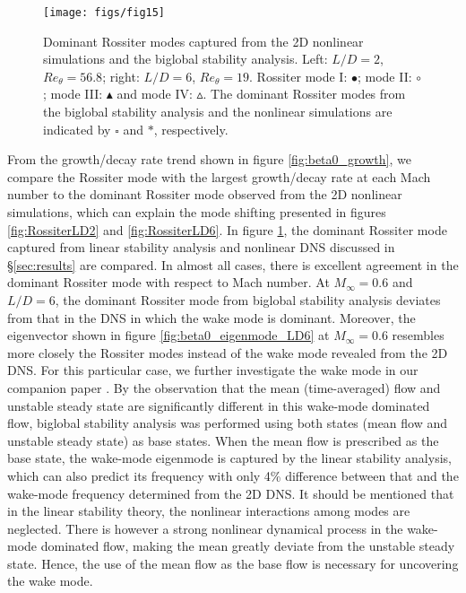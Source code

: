 \documentclass{jfm}
\begin{document}
\begin{figure}
\begin{center}
  \texttt{[image: figs/fig15]}
   \caption{Dominant Rossiter modes captured from the 2D nonlinear simulations and the biglobal stability analysis. Left: $L/D=2$, $Re_\theta=56.8$; right: $L/D=6$, $Re_\theta=19$. Rossiter mode I: $\bullet$; mode II: $\circ$; mode III: $\blacktriangle$ and mode IV: $\vartriangle$. The dominant Rossiter modes from the biglobal stability analysis and the nonlinear simulations are indicated by $\square$ and $*$, respectively. } 
      \label{fig:beta0_stl} 
\end{center}
\end{figure}
From the growth/decay rate trend shown in figure \ref{fig:beta0_growth}, we compare the Rossiter mode with the largest growth/decay rate at each Mach number to the dominant Rossiter mode observed from the 2D nonlinear simulations, which can explain the mode shifting presented in figures \ref{fig:RossiterLD2} and \ref{fig:RossiterLD6}. In figure \ref{fig:beta0_stl}, the dominant Rossiter mode captured from linear stability analysis and nonlinear DNS discussed in \S \ref{sec:results} are compared. In almost all cases, there is excellent agreement in the dominant Rossiter mode with respect to Mach number. At $M_\infty=0.6$ and $L/D=6$, the dominant Rossiter mode from biglobal stability analysis deviates from that in the DNS in which the wake mode is dominant. Moreover, the eigenvector shown in figure \ref{fig:beta0_eigenmode_LD6} at $M_\infty=0.6$ resembles more closely the Rossiter modes instead of the wake mode revealed from the 2D DNS. For this particular case, we further investigate the wake mode in our companion paper \citep{Sun:TCFD16}. By the observation that the mean (time-averaged) flow and unstable steady state are significantly different in this wake-mode dominated flow, biglobal stability analysis was performed using both states (mean flow and unstable steady state) as base states. When the mean flow is prescribed as the base state, the wake-mode eigenmode is captured by the linear stability analysis, which can also predict its frequency with only 4\% difference between that and the wake-mode frequency determined from the 2D DNS. It should be mentioned that in the linear stability theory, the nonlinear interactions among modes are neglected. There is however a strong nonlinear dynamical process in the wake-mode dominated flow, making the mean greatly deviate from the unstable steady state. Hence, the use of the mean flow as the base flow is necessary for uncovering the wake mode. 
\end{document}
